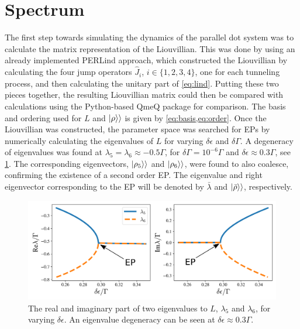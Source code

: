 \documentclass[../main.tex]{subfiles}
\begin{document}
\section{Spectrum}
The first step towards simulating the dynamics of the parallel dot system was to calculate the matrix representation of the Liouvillian. This was done by using an already implemented PERLind approach, which constructed the Liouvillian by calculating the four jump operators $\hat J_i$, $i\in\{1,2,3,4\}$, one for each tunneling process, and then calculating the unitary part of \cref{eq:lind}. Putting these two pieces together, the resulting Liouvillian matrix could then be compared with calculations using the Python-based QmeQ package \cite{qmeq} for comparison. The basis and ordering used for $L$ and $\ket{\rho}\rangle$ is given by \cref{eq:basis,eq:order}. Once the Liouvillian was constructed, the parameter space was searched for EPs by numerically calculating the eigenvalues of $L$ for varying $\delta\epsilon$ and $\delta\Gamma$. A degeneracy of eigenvalues was found at $\lambda_5 = \lambda_6\approx -0.5\Gamma$, for $\delta\Gamma = 10^{-6}\Gamma$ and $\delta\epsilon \approx 0.3\Gamma$, see \cref{fig:tuning}. The corresponding eigenvectors, $\ket{\rho_5}\rangle$ and $\ket{\rho_6}\rangle$, were found to also coalesce, confirming the existence of a second order EP. The eigenvalue and right eigenvector corresponding to the EP will be denoted by $\bar \lambda$ and $\ket{\bar\rho}\rangle$, respectively.
\begin{figure}[H]
    \centering
    \includegraphics[width=0.9\linewidth]{figures/tuning.png}
    \caption{The real and imaginary part of two eigenvalues to $L$, $\lambda_5$ and $\lambda_6$, for varying $\delta\epsilon$. An eigenvalue degeneracy can be seen at $\delta\epsilon\approx0.3\Gamma$.}
    \label{fig:tuning}
\end{figure}
\end{document}
